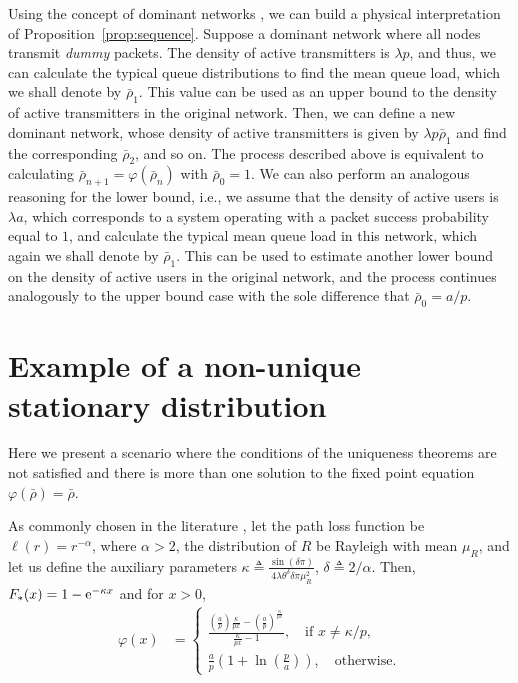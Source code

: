 Using the concept of dominant networks \cite{ephremides1988stability}, we can build a physical interpretation of Proposition~\ref{prop:sequence}.
%
Suppose a dominant network where all nodes transmit \textit{dummy} packets. The density of active transmitters is $\lambda p$, and thus, we can calculate the typical queue distributions to find the mean queue load, which we shall denote by $\bar\rho_1$. This value can be used as an upper bound to the density of active transmitters in the original network. Then, we can define a new dominant network, whose density of active transmitters is given by $\lambda p \bar\rho_1$ and find the corresponding $\bar\rho_2$, and so on. The process described above is equivalent to calculating $\bar\rho_{n+1} = \varphi(\bar\rho_n)$ with $\bar\rho_0 = 1$.
%
We can also perform an analogous reasoning for the lower bound, i.e., we assume that the density of active users is $\lambda a$, which corresponds to a system operating with a packet success probability equal to $1$, and calculate the typical mean queue load in this network, which again we shall denote by $\bar\rho_1$. This can be used to estimate another lower bound on the density of active users in the original network, and the process continues analogously to the upper bound case with the sole difference that $\bar\rho_0 = a/p$.

\section{Example of a non-unique stationary distribution}
\label{sec:counter-example}

Here we present a scenario where the conditions of the uniqueness theorems are not satisfied and there is more than one solution to the fixed point equation $\varphi(\bar\rho) = \bar\rho$.

As commonly chosen in the literature \cite{haenggi2021stochastic}, let the path loss function be $\ell(r) = r^{-\alpha}$, where $\alpha>2$, the distribution of $R$ be Rayleigh with mean $\mu_R$, and let us define the auxiliary parameters $\kappa \triangleq \frac{\sin(\delta\pi)}{4 \lambda \theta^\delta \delta \pi \mu_R^2}$, $\delta\triangleq 2/\alpha$. Then, ${F_*(x) = 1-\mathrm{e}^{-\kappa x}}$ and for $x>0$,
\begin{align}
    \varphi(x) &= 
    \begin{cases}
        \frac{\left(\frac{a}{p}\right)\frac{\kappa}{px}-\left(\frac{a}{p}\right)^{\frac{\kappa}{px}}}{\frac{\kappa}{px}-1},\quad \text{if } x \neq \kappa/p,\\
        \frac{a}{p} \left(1 + \ln\!\left(\frac{p}{a}\right)\right), \quad\text{otherwise.}
    \end{cases}
\end{align}

